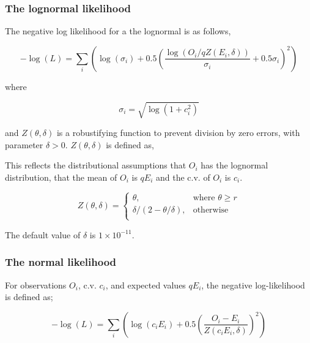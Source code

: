 {{{{\subsubsection*{The lognormal likelihood}

The negative log likelihood for a the lognormal is as follows,

\begin{equation}
- \log \left(L \right) = \sum\limits_i \left( \log \left( \sigma _i \right) + 0.5\left( \frac{\log \left(O_i / q Z \left(E_i,\delta \right) \right)}{\sigma_i} + 0.5 \sigma_i \right)^2 \right)
\end{equation}

where 

\begin{equation}
\sigma_i  = \sqrt{\log \left(1+c_i^2 \right)}
\end{equation}

and $Z \left(\theta,\delta \right)$ is a robustifying function to prevent division by zero errors, with parameter $\delta>0$. $Z \left(\theta,\delta \right)$ is defined as,

This reflects the distributional assumptions that  $O_i$ has the lognormal distribution, that the mean of $O_i$ is $qE_i$  and the c.v. of $O_i$ is $c_i$.

\begin{equation}
Z \left(\theta,\delta \right) = \begin{cases}
\theta, & \text{where $\theta \ge r$} \\
\delta/\left( 2-\theta/\delta \right), & \text{otherwise} \\  
\end{cases}
\end{equation}

The default value of $\delta$ is $1 \times 10^{-11}$.

\subsubsection*{The normal likelihood}

For observations $O_i$, c.v. $c_i$, and expected values $qE_i$, the negative log-likelihood is defined as;

\begin{equation}
- \log \left(L \right) = \sum\limits_i \left( \log \left( c_i E_i \right) +0.5 \left( \frac{O_i-E_i}{Z\left(c_i E_i,\delta \right)}\right)^2\right)
\end{equation}

}}}}
